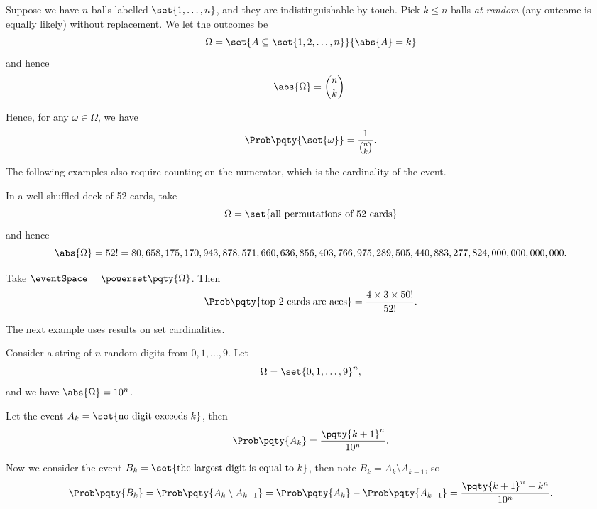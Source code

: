 \begin{example}
    \label{ex:picking-balls-from-bag}%
    Suppose we have \(n\) balls labelled \(\set{1, \ldots, n}\), and they are indistinguishable by touch. Pick \(k \leq n\) balls \emph{at random} (any outcome is equally likely) without replacement. We let the outcomes be
    \[
        \Omega = \set{A \subseteq \set{1, 2, \ldots, n}}{\abs{A} = k}
    \]
    and hence
    \[
        \abs{\Omega} = \binom{n}{k}.
    \]

    Hence, for any \(\omega \in \Omega\), we have
    \[
        \Prob\pqty{\set{\omega}} = \frac{1}{\binom{n}{k}}.
    \]
\end{example}

The following examples also require counting on the numerator, which is the cardinality of the event.

\begin{example}
    \label{ex:deck-of-cards}%
    In a well-shuffled deck of 52 cards, take
    \[
        \Omega = \set{\text{all permutations of 52 cards}}
    \]
    and hence
    \[
        \abs{\Omega} = 52! = 80,658,175,170,943,878,571,660,636,856,403,766,975,289,505,440,883,277,824,000,000,000,000.
    \]
    
    Take \(\eventSpace = \powerset\pqty{\Omega}\). Then
    \[
        \Prob\pqty{\text{top 2 cards are aces}} = \frac{4 \times 3 \times 50!}{52!}.
    \]
\end{example}

The next example uses results on set cardinalities.

\begin{example}
    \label{ex:largest-digit}%
    Consider a string of \(n\) random digits from \(0, 1, \ldots, 9\). Let
    \[
        \Omega = \set{0, 1, \ldots, 9}^n,
    \]
    and we have \(\abs{\Omega} = 10^n\).

    Let the event \(A_k = \set{\text{no digit exceeds }k}\), then
    \[
        \Prob\pqty{A_k} = \frac{\pqty{k + 1}^{n}}{10^n}.
    \]

    Now we consider the event \(B_k = \set{\text{the largest digit is equal to }k}\), then note \(B_k = A_k \setminus A_{k - 1}\), so
    \[
        \Prob\pqty{B_k} = \Prob\pqty{A_k \setminus A_{k - 1}} = \Prob\pqty{A_k} - \Prob\pqty{A_{k - 1}} = \frac{\pqty{k + 1}^n - k^n}{10^n}.
    \]
\end{example}

